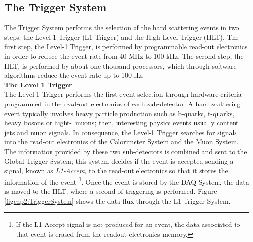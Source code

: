 

\subsection{The Trigger System}
\label{subsec:Trigger}

\noindent The Trigger System performs the selection of the hard scattering events in two steps:
the Level-1 Trigger (L1 Trigger) and the High Level Trigger (HLT). The first step, the Level-1 Trigger,
is performed by programmable read-out electronics in order to reduce the event rate from 40 MHz 
to 100 kHz. The second step, the HLT, is performed by about one thousand processors, which through
software algorithms reduce the event rate up to 100 Hz. \\

\textbf{The Level-1 Trigger}\\

\noindent The Level-1 Trigger performs the first event selection through hardware criteria programmed 
in the read-out electronics of each sub-detector. A hard scattering event typically 
involves heavy particle production such as b-quarks, t-quarks, heavy bosons 
or hight-\pt~muons; then, interesting physics events usually content jets and muon signals. In 
consequence, the Level-1 Trigger searches for signals into the read-out electronics 
of the Calorimeter System and the Muon System. The information provided by these two sub-detectors
is combined and sent to the Global Trigger System; this system decides
if the event is accepted sending a signal, known as \textit{L1-Accept}, to the read-out electronics so that
it stores the information of the event \footnote[1]{If the L1-Accept signal is not produced for an event, the data associated to that event is 
erased from the readout electronics memory.}. Once the event is stored by the DAQ System, the data is moved 
to the HLT, where a second of triggering is performed. Figure \ref{figchp2:TriggerSystem} shows 
the data flux through the L1 Trigger System. \\

